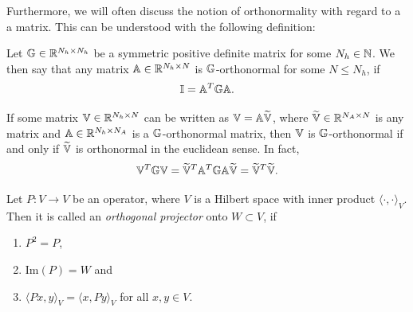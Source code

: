 Furthermore, we will often discuss the notion of orthonormality with regard to a a matrix. This
can be understood with the following definition:

\begin{definition} \label{def: matrix orthonormality}
    Let $\mathbb{G} \in \mathbb{R}^{N_h \times N_h}$ be a symmetric positive definite matrix for some $N_h \in \mathbb{N}$. We then say that
    any matrix $\mathbb{A} \in \mathbb{R}^{N_h \times N}$ is $\mathbb{G}$-orthonormal for some $N \leq N_h$, if
    \begin{equation*}
        \mathbb{I} = \mathbb{A}^T \mathbb{G} \mathbb{A}.
    \end{equation*}
\end{definition}

\begin{remark}
    If some matrix $\mathbb{V} \in \mathbb{R}^{N_h \times N}$ can be written as $\mathbb{V} = \mathbb{A} \widetilde{\mathbb{V}}$, where
    $\widetilde{\mathbb{V}} \in \mathbb{R}^{N_A \times N}$ is any matrix and $\mathbb{A} \in \mathbb{R}^{N_h \times N_A}$ is a $\mathbb{G}$-orthonormal matrix, 
    then $\mathbb{V}$ is $\mathbb{G}$-orthonormal if and only if $\widetilde{\mathbb{V}}$ is orthonormal in the euclidean sense. 
    In fact,
    \begin{equation*}
        \mathbb{V}^T \mathbb{G} \mathbb{V} = \widetilde{\mathbb{V}}^T \mathbb{A}^T \mathbb{G} \mathbb{A} \widetilde{\mathbb{V}} = \widetilde{\mathbb{V}}^T \widetilde{\mathbb{V}}.
    \end{equation*}
\end{remark}

\begin{definition} \label{def: orthogonal projector}
    Let $P: V \to V$ be an operator, where $V$ is a Hilbert space with inner product $\langle \cdot, \cdot \rangle_V$.
    Then it 
    is called an \emph{orthogonal projector} onto $W \subset V$, if
    \begin{enumerate}
        \item $P^2 = P$,
        \item $\text{Im}(P) = W$ and
        \item $\langle Px, y \rangle_V = \langle x, Py \rangle_V$ for all $x, y \in V$.
    \end{enumerate}
\end{definition}

